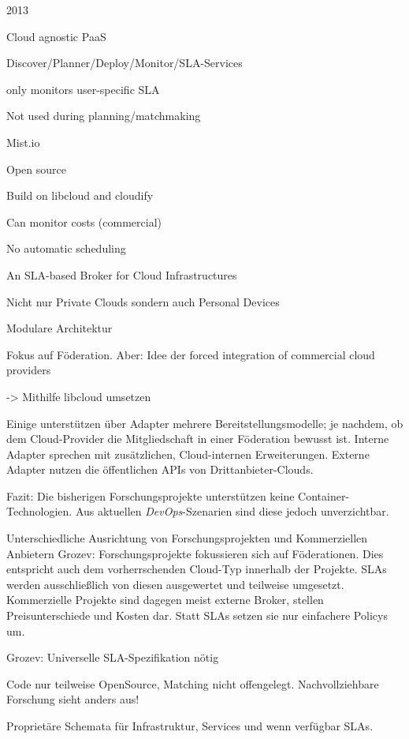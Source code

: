 2013 

Cloud agnostic PaaS 

Discover/Planner/Deploy/Monitor/SLA-Services 

only monitors user-specific SLA 

Not used during planning/matchmaking 



Mist.io 

Open source 

Build on libcloud and cloudify 

Can monitor costs (commercial) 

No automatic scheduling 



An SLA-based Broker for Cloud Infrastructures 

Nicht nur Private Clouds sondern auch Personal Devices 

Modulare Architektur 

Fokus auf Föderation. Aber: Idee der forced integration of commercial cloud providers 

-> Mithilfe libcloud umsetzen 




Einige unterstützen über Adapter mehrere Bereitstellungsmodelle; je nachdem, ob dem Cloud-Provider die Mitgliedschaft in einer Föderation bewusst ist. Interne Adapter sprechen mit zusätzlichen, Cloud-internen Erweiterungen. Externe Adapter nutzen die öffentlichen APIs von Drittanbieter-Clouds.


Fazit: Die bisherigen Forschungsprojekte unterstützen keine Container-Technologien. Aus aktuellen \emph{DevOps}-Szenarien sind diese jedoch unverzichtbar.

Unterschiedliche Ausrichtung von Forschungsprojekten und Kommerziellen Anbietern Grozev: Forschungsprojekte fokussieren sich auf Föderationen. Dies entspricht auch dem vorherrschenden Cloud-Typ innerhalb der Projekte. SLAs werden ausschließlich von diesen ausgewertet und teilweise umgesetzt. Kommerzielle Projekte sind dagegen meist externe Broker, stellen Preisunterschiede und Kosten dar. Statt SLAs setzen sie nur einfachere Policys um.

Grozev: Universelle SLA-Spezifikation nötig

Code nur teilweise OpenSource, Matching nicht offengelegt. Nachvollziehbare Forschung sieht anders aus!

Proprietäre Schemata für Infrastruktur, Services und wenn verfügbar SLAs. 

